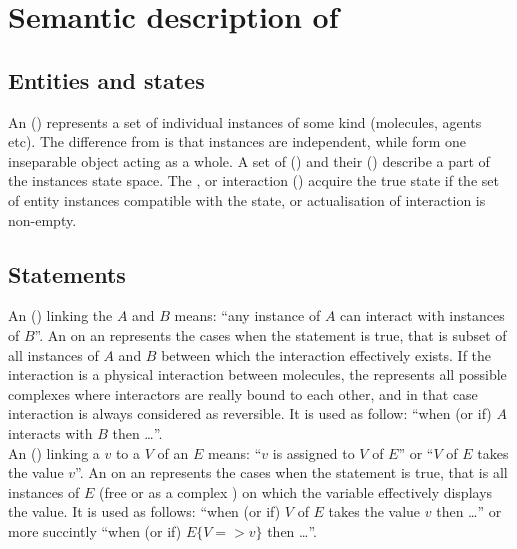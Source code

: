 \section{Semantic description of \ERs}


\subsection{Entities and states}

An  () represents a set of individual instances of some kind (molecules, agents etc). The difference from \SBGNPDLone {} is that  instances are independent, while  form one inseparable object acting as a whole. A set of  () and their  () describe a part of the  instances state space. The  , or  interaction  () acquire the true state if the set of entity instances compatible with the  state, or  actualisation of interaction is non-empty. 

 
\subsection{Statements}

An  () linking the  $A$ and $B$ means: ``any instance of $A$ can interact with instances of $B$''. An  on an  represents the cases when the statement is true, that is subset of all instances of $A$ and $B$ between which the interaction effectively exists. If the interaction is a physical interaction between molecules, the  represents all possible complexes where interactors are really bound to each other, and in that case interaction is always considered as reversible. It is used as follow: ``when (or if) $A$ interacts with $B$ then \ldots''.\\[\baselineskip]

\noindent
An  () linking a  $v$ to a  $V$ of an  $E$ means: ``$v$ is assigned to $V$ of $E$'' or ``$V$ of $E$ takes the value $v$''. An  on an  represents the cases when the statement is true, that is all instances of $E$ (free or as a complex ) on which the variable effectively displays the value. It is used as follows: ``when (or if) $V$ of $E$ takes the value $v$ then \ldots'' or more succintly ``when (or if) $E\{V => v\}$ then \ldots''.\\[\baselineskip]

